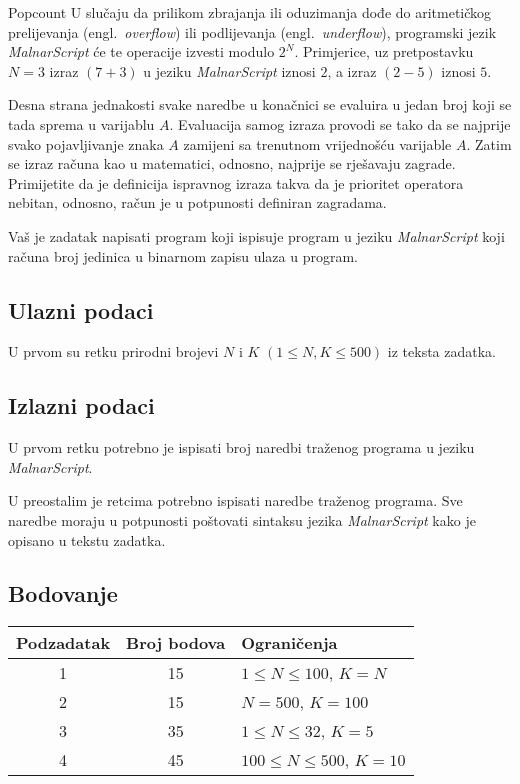 \begin{statement}[
  problempoints=110,
  timelimit=1 sekunda,
  memorylimit=512 MiB,
]{Popcount}
U slučaju da prilikom zbrajanja ili oduzimanja dođe do aritmetičkog
prelijevanja (engl.\ \textit{overflow}) ili podlijevanja (engl.\
\textit{underflow}), programski jezik \textit{MalnarScript} će te operacije
izvesti modulo $2^N$. Primjerice, uz pretpostavku $N=3$ izraz $(7+3)$ u jeziku
\textit{MalnarScript} iznosi $2$, a izraz $(2-5)$ iznosi $5$.

Desna strana jednakosti svake naredbe u konačnici se evaluira u jedan broj koji
se tada sprema u varijablu $A$. Evaluacija samog izraza provodi se tako da se
najprije svako pojavljivanje znaka $A$ zamijeni sa trenutnom vrijednošću
varijable $A$. Zatim se izraz računa kao u matematici, odnosno, najprije se
rješavaju zagrade. Primijetite da je definicija ispravnog izraza takva da je
prioritet operatora nebitan, odnosno, račun je u potpunosti definiran
zagradama.

Vaš je zadatak napisati program koji ispisuje program u jeziku
\textit{MalnarScript} koji računa broj jedinica u binarnom zapisu ulaza u
program.

\subsection*{Ulazni podaci}
U prvom su retku prirodni brojevi $N$ i $K$ $(1 \le N, K \le 500)$ iz teksta
zadatka.

\subsection*{Izlazni podaci}
U prvom retku potrebno je ispisati broj naredbi traženog programa u jeziku
\textit{MalnarScript}.

U preostalim je retcima potrebno ispisati naredbe traženog programa. Sve
naredbe moraju u potpunosti poštovati sintaksu jezika \textit{MalnarScript}
kako je opisano u tekstu zadatka.

\subsection*{Bodovanje}
{\renewcommand{\arraystretch}{1.4}
  \setlength{\tabcolsep}{6pt}
  \begin{tabular}{ccl}
 Podzadatak & Broj bodova & Ograničenja \\ \midrule
  1 & 15 & $1 \le N \le 100$, $K = N$ \\
  2 & 15 & $N = 500$, $K = 100$ \\
  3 & 35 & $1 \le N \le 32$, $K=5$ \\
  4 & 45 & $100 \le N \le 500$, $K=10$
\end{tabular}}


\end{statement}
